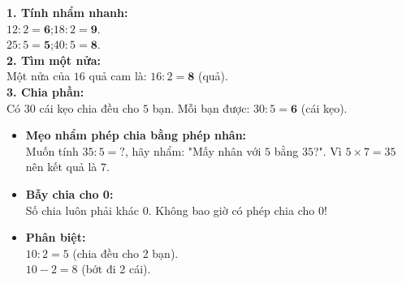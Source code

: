 \documentclass[12pt,a4paper]{article}
\begin{document}
\vspace{-2.5mm}
\noindent
\begin{minipage}[t]{0.49\textwidth}\vspace{0pt}
\begin{tcolorbox}[
  enhanced,
  colback=green!4!white,
  colframe=green!60!black,
  arc=2mm, boxrule=0.8pt,
  left=2mm, right=2mm, top=1.8mm, bottom=1.8mm,
  title={\footnotesize\bfseries\color{white}\faCheckCircle\ Ví dụ thực hành chuẩn mực}
]
{\footnotesize
\textbf{1. Tính nhẩm nhanh:}\\
$12 : 2 = \mathbf{6}$;\quad $18 : 2 = \mathbf{9}$.\\
$25 : 5 = \mathbf{5}$;\quad $40 : 5 = \mathbf{8}$.\\
\textbf{2. Tìm một nửa:}\\
Một nửa của $16$ quả cam là: $16 : 2 = \mathbf{8}$ (quả).\\
\textbf{3. Chia phần:}\\
Có $30$ cái kẹo chia đều cho $5$ bạn. Mỗi bạn được: $30 : 5 = \mathbf{6}$ (cái kẹo).
}
\end{tcolorbox}
\end{minipage}
\hfill
\begin{minipage}[t]{0.49\textwidth}\vspace{0pt}
\begin{tcolorbox}[
  enhanced,
  colback=red!4!white,
  colframe=red!70!black,
  arc=2mm, boxrule=0.8pt,
  left=2mm, right=2mm, top=1.8mm, bottom=1.8mm,
  title={\footnotesize\bfseries\color{white}\faExclamationTriangle\ Mẹo tránh bẫy trắc nghiệm}
]
{\footnotesize
\begin{itemize}\setlength{\itemsep}{1.5pt}\setlength{\leftskip}{-2.5mm}
  \item \textbf{Mẹo nhẩm phép chia bằng phép nhân:}\\
  Muốn tính $35 : 5 = ?$, hãy nhẩm: "Mấy nhân với $5$ bằng $35$?". Vì $5 \times 7 = 35$ nên kết quả là $7$.
  \item \textbf{Bẫy chia cho 0:}\\
  Số chia luôn phải khác $0$. Không bao giờ có phép chia cho $0$!
  \item \textbf{Phân biệt:}\\
  $10 : 2 = 5$ (chia đều cho 2 bạn).\\
  $10 - 2 = 8$ (bớt đi 2 cái).
\end{itemize}
}
\end{tcolorbox}
\end{minipage}
\end{document}
